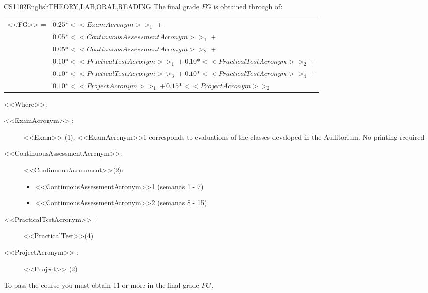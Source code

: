     \begin{evaluation}{CS1102}{English}{THEORY,LAB,ORAL,READING}
    The final grade $FG$ is obtained through of:
    
    \begin{tabular}{cl}
        <<FG>> = & $0.25*<<ExamAcronym>>_{1}$ + \\
                 & $0.05*<<ContinuousAssessmentAcronym>>_{1}$ +  \\
                 & $0.05*<<ContinuousAssessmentAcronym>>_{2}$ + \\
                 & $0.10*<<PracticalTestAcronym>>_{1} + 0.10*<<PracticalTestAcronym>>_{2}$ + \\
                 & $0.10*<<PracticalTestAcronym>>_{3} + 0.10*<<PracticalTestAcronym>>_{4}$ + \\
                 & $0.10*<<ProjectAcronym>>_{1} + 0.15*<<ProjectAcronym>>_{2}$
    \end{tabular}

    \noindent <<Where>>:
    \begin{description}
        \item[<<ExamAcronym>> :] <<Exam>> (1). <<ExamAcronym>>1 corresponds to evaluations of the classes developed in the Auditorium. No printing required
        \item[<<ContinuousAssessmentAcronym>>:]<<ContinuousAssessment>>(2):
           \begin{itemize}
               \item <<ContinuousAssessmentAcronym>>1 (semanas 1 - 7)  
               \item <<ContinuousAssessmentAcronym>>2 (semanas 8 - 15)
         \end{itemize}
    \item[<<PracticalTestAcronym>> :] <<PracticalTest>>(4)
    \item[<<ProjectAcronym>> :] <<Project>> (2)
    \end{description}
    
    \noindent To pass the course you must obtain 11 or more in the final grade $FG$.
    \end{evaluation}
    
    
    
